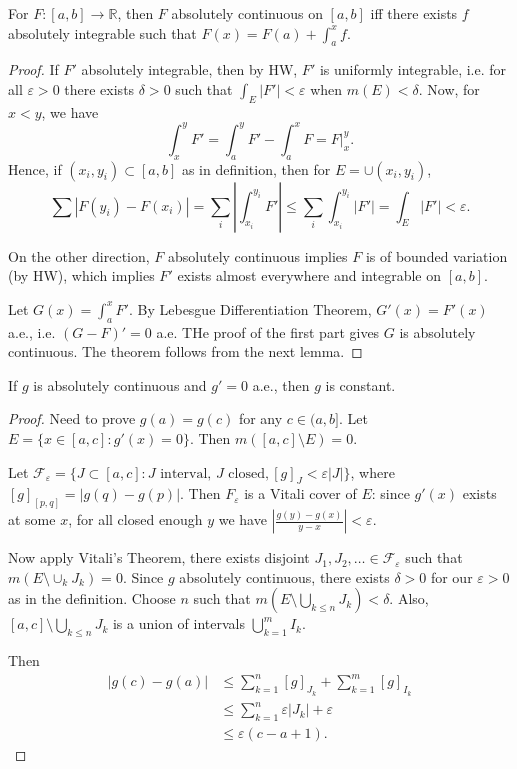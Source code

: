 \begin{theorem}
	For $F:[a,b] \to \mathbb{R}$, then $F$ absolutely continuous on $[a,b]$ iff there exists $f$ absolutely integrable such that $F(x) = F(a) + \int _a^x f$.
	
\end{theorem}
\begin{proof}
	If $F'$ absolutely integrable, then by HW, $F'$ is uniformly integrable, i.e. for all $\varepsilon>0$ there exists $\delta>0$ such that $\int _E |F'| < \varepsilon$ when $m(E) < \delta$. Now, for $x < y$, we have
	\[
		\int _x^y F' = \int _a ^y F' - \int _a^x F = F|_x^y
	.\] 
	Hence, if $(x_i, y_i) \subset [a,b]$ as in definition, then for $E = \cup (x_i, y_i)$,
	\[
		\sum |F(y_i) - F(x_i)| = \sum_i |\int _{x_i}^{y_i} F'| \le \sum_i \int_{x_i}^{y_i}|F'| = \int_E |F'| < \varepsilon
	.\] 


	On the other direction, $F$ absolutely continuous implies $F$ is of bounded variation (by HW), which implies $F'$ exists almost everywhere and integrable on $[a,b]$.

	Let $G(x) = \int _a^x F'$. By Lebesgue Differentiation Theorem, $G'(x) = F'(x)$ a.e., i.e. $(G - F)' = 0$ a.e. THe proof of the first part gives $G$ is absolutely continuous. The theorem follows from the next lemma.

	
\end{proof}
\begin{lemma}
		If $g$ is absolutely continuous and $g' = 0$ a.e., then $g$ is constant.
	\end{lemma}
\begin{proof}
	Need to prove $g(a) = g(c)$ for any $c \in (a, b]$. Let $E = \{x \in [a,c]: g'(x) = 0\} $. Then $m([a,c] \setminus E) =0$.

	Let $\mathcal{F}_\varepsilon = \{J \subset [a,c]: J \text{ interval, } J \text{ closed}, [g]_J < \varepsilon |J|\} $, where $[g]_{[p,q]} = |g(q) - g(p)|$. Then  $F_\varepsilon$ is a Vitali cover of $E$: since $g'(x)$ exists at some $x$, for all closed enough $y$ we have $\left| \frac{g(y) - g(x)}{y - x} \right| <\varepsilon$.

	Now apply Vitali's Theorem, there exists disjoint $J_1, J_2, \ldots \in \mathcal{F}_\varepsilon$ such that $m\left( E \setminus  \cup _k J_k \right) = 0$. Since $g$ absolutely continuous, there exists $\delta>0$ for our $\varepsilon>0$ as in the definition. Choose $n$ such that $m\left( E \setminus  \bigcup_{k \le n} J_k \right) < \delta$. Also, $[a,c] \setminus \bigcup_{k \le n} J_k$ is a union of intervals $\bigcup_{k = 1} ^m I_k$.

	Then
	\begin{align*}
		|g(c) - g(a)|
		&\le  \sum_{k=1}^{n} [g]_{J_k} + \sum_{k=1}^{m} [g]_{I_k}\\
		&\le  \sum_{k=1}^{n} \varepsilon |J_k| + \varepsilon\\
		&\le \varepsilon (c-a + 1)
	.\end{align*}
\end{proof}

